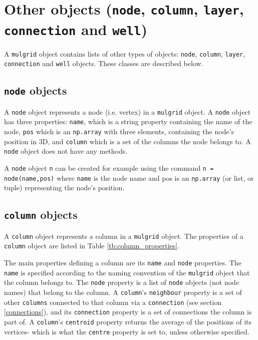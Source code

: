 \section{Other objects (\texttt{node}, \texttt{column}, \texttt{layer}, \texttt{connection} and \texttt{well})}
\label{other_mulgrid_objects}

A \texttt{mulgrid} object contains lists of other types of objects: \texttt{node}, \texttt{column}, \texttt{layer}, \texttt{connection} and \texttt{well} objects.  These classes are described below.

\subsection{\texttt{node} objects}

A \texttt{node} object represents a node (i.e. vertex) in a \texttt{mulgrid} object.  A \texttt{node} object has three properties: \texttt{name}, which is a string property containing the name of the node, \texttt{pos} which is an \texttt{np.array} with three elements, containing the node's position in 3D, and \texttt{column} which is a set of the columns the node belongs to.  A \texttt{node} object does not have any methods.

A \texttt{node} object \texttt{n} can be created for example using the command \texttt{n = node(name,pos)} where \texttt{name} is the node name and pos is an \texttt{np.array} (or list, or tuple) representing the node's position.

\subsection{\texttt{column} objects}
\label{columnobjects}

A \texttt{column} object represents a column in a \texttt{mulgrid} object.  The properties of a \texttt{column} object are listed in Table \ref{tb:column_properties}.

The main properties defining a column are its \texttt{name} and \texttt{node} properties.  The \texttt{name} is specified according to the naming convention of the \texttt{mulgrid} object that the column belongs to.  The \texttt{node} property is a list of \texttt{node} objects (not node names) that belong to the column.  A \texttt{column}'s \texttt{neighbour} property is a set of other \texttt{columns} connected to that column via a \texttt{connection} (see section \ref{connections}), and its \texttt{connection} property is a set of connections the column is part of.  A \texttt{column}'s \texttt{centroid} property returns the average of the positions of its vertices- which is what the \texttt{centre} property is set to, unless otherwise specified.


